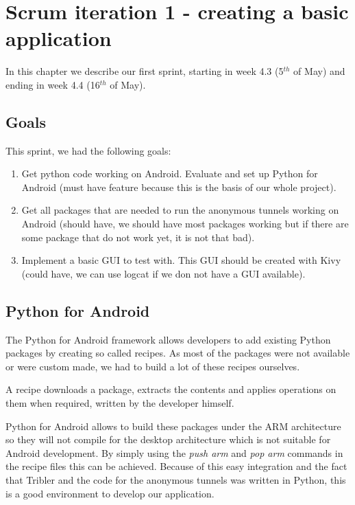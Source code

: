 \chapter{Scrum iteration 1 - creating a basic application}
\label{iteration1}
	In this chapter we describe our first sprint, starting in week 4.3 (5$^{th}$ of May) and ending in week 4.4 (16$^{th}$ of May).

	\section{Goals}
		This sprint, we had the following goals:
	
		\begin{enumerate}
			\item Get python code working on Android. Evaluate and set up Python for Android (must have feature because this is the basis of our whole project).
			\item Get all packages that are needed to run the anonymous tunnels working on Android (should have, we should have most packages working but if there are some package that do not work yet, it is not that bad).
			\item Implement a basic GUI to test with. This GUI should be created with Kivy (could have, we can use logcat if we don not have a GUI available).
		\end{enumerate}
	
	\section{Python for Android}
		The Python for Android framework allows developers to add existing Python packages by creating so called recipes. As most of the packages were not available or were custom made, we had to build a lot of these recipes ourselves.
	
		A recipe downloads a package, extracts the contents and applies operations on them when required, written by the developer himself.
	
		Python for Android allows to build these packages under the ARM architecture so they will not compile for the desktop architecture which is not suitable for Android development. By simply using the \emph{push arm} and \emph{pop arm} commands in the recipe files this can be achieved. Because of this easy integration and the fact that Tribler and the code for the anonymous tunnels was written in Python, this is a good environment to develop our application.
	
